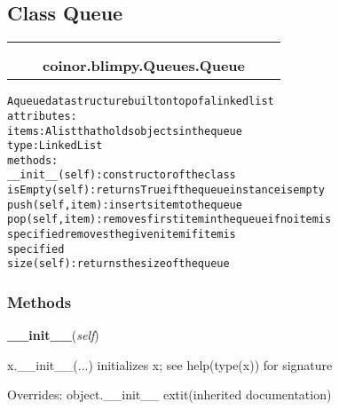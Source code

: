
\subsection{Class Queue}

    \label{coinor:blimpy:Queues:Queue}
\begin{tabular}{cccccc}
\multicolumn{2}{r}{\settowidth{\BCL}{object}\multirow{2}{\BCL}{object}}
&&
  \\\cline{3-3}
  &&\multicolumn{1}{c|}{}
&&
  \\
&&\multicolumn{2}{l}{\textbf{coinor.blimpy.Queues.Queue}}
\end{tabular}

\begin{alltt}

A queue data structure built on top of a linked list
attributes:
    items:    A list that holds objects in the queue
              type: LinkedList
methods:
    \_\_init\_\_(self):        constructor of the class
    isEmpty(self):         returns True if the queue instance is empty
    push(self,item):       inserts item to the queue
    pop(self,item):        removes first item in the queue if no item is
                           specified removes the given item if item is
                           specified
    size(self):            returns the size of the queue
\end{alltt}



  \subsubsection{Methods}

    \vspace{0.5ex}

\hspace{.8\funcindent}\begin{boxedminipage}{\funcwidth}

    \raggedright \textbf{\_\_init\_\_}(\textit{self})

\setlength{\parskip}{2ex}
    x.\_\_init\_\_(...) initializes x; see help(type(x)) for signature

\setlength{\parskip}{1ex}
      Overrides: object.\_\_init\_\_ 	extit{(inherited documentation)}

    \end{boxedminipage}

